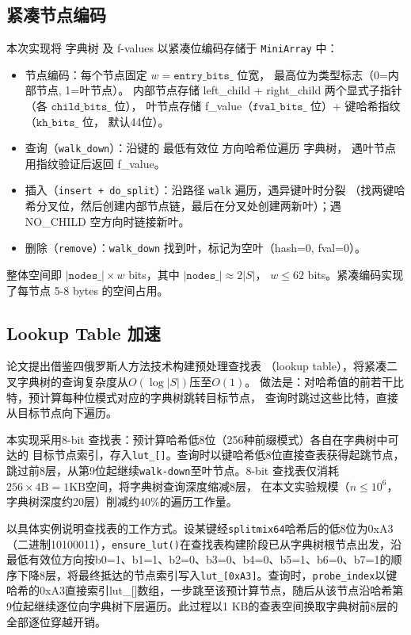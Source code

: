 \documentclass[
    type = bachelor,
    fontset = win,
    decl-page = true,
  ]{njuthesis}
\begin{document}
\subsection{紧凑节点编码}

本次实现将 字典树 及 f-values 以紧凑位编码存储于 \texttt{MiniArray} 中：

\begin{itemize}
  \item 节点编码：每个节点固定 $w=\texttt{entry\_bits\_}$ 位宽，
    最高位为类型标志（0=内部节点, 1=叶节点）。
    内部节点存储 left\_child + right\_child 两个显式子指针（各 $\texttt{child\_bits\_}$ 位），
    叶节点存储 f\_value（$\texttt{fval\_bits\_}$ 位）+ 键哈希指纹（$\texttt{kh\_bits\_}$ 位，
    默认44位）。
  \item 查询（\texttt{walk\_down}）：沿键的 最低有效位 方向哈希位遍历 字典树，
    遇叶节点用指纹验证后返回 f\_value。
  \item 插入（\texttt{insert + do\_split}）：沿路径 \texttt{walk} 遍历，遇异键叶时分裂
    （找两键哈希分叉位，然后创建内部节点链，最后在分叉处创建两新叶）；遇 NO\_CHILD 空方向时链接新叶。
  \item 删除（\texttt{remove}）：\texttt{walk\_down} 找到叶，标记为空叶（hash=0, fval=0）。
\end{itemize}
整体空间即 $ |\texttt{nodes\_}| \times w$ bits，其中 $|\texttt{nodes\_}| \approx 2|S|$，
$w \le 62$ bits。紧凑编码实现了每节点 5-8 bytes 的空间占用。

\subsection{Lookup Table 加速}

论文\cite{1}提出借鉴四俄罗斯人方法技术\cite{7}构建预处理查找表
（lookup table），将紧凑二叉字典树的查询复杂度从$O(\log|S|)$压至$O(1)$。
做法是：对哈希值的前若干比特，预计算每种位模式对应的字典树跳转目标节点，
查询时跳过这些比特，直接从目标节点向下遍历。

本实现采用8-bit 查找表：预计算哈希低8位（256种前缀模式）各自在字典树中可达的
目标节点索引，存入\texttt{lut\_[]}。查询时以键哈希低8位直接查表获得起跳节点，
跳过前8层，从第9位起继续\texttt{walk-down}至叶节点。8-bit 查找表仅消耗
$256 \times 4\text{B} = 1\text{KB}$空间，将字典树查询深度缩减8层，
在本文实验规模（$n\leq 10^6$，字典树深度约20层）削减约40\%的遍历工作量。

以具体实例说明查找表的工作方式。设某键经\texttt{splitmix64}哈希后的低8位为0xA3（二进制10100011），\texttt{ensure\_lut()}在查找表构建阶段已从字典树根节点出发，沿最低有效位方向按b0=1、b1=1、b2=0、b3=0、b4=0、b5=1、b6=0、b7=1的顺序下降8层，将最终抵达的节点索引写入\texttt{lut\_[0xA3]}。查询时，\texttt{probe\_index}以键哈希的0xA3直接索引lut\_[]数组，一步跳至该预计算节点，随后从该节点沿哈希第9位起继续逐位向字典树下层遍历。此过程以1 KB的查表空间换取字典树前8层的全部逐位穿越开销。
\end{document}
